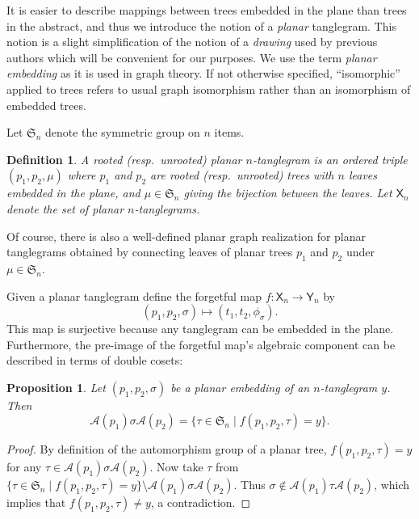 \documentclass{amsart}
\newtheorem{proposition}{Proposition}
\newtheorem{definition}{Definition}
\newcommand{\fS}{\mathfrak S}
\newcommand{\aut}{\mathcal A}
\newcommand{\pairing}{\mu}
\newcommand{\ptangle}{\mathsf{X}}
\newcommand{\tangle}{\mathsf{Y}}
\begin{document}
It is easier to describe mappings between trees embedded in the plane than trees in the abstract, and thus we introduce the notion of a \emph{planar} tanglegram.
This notion is a slight simplification of the notion of a \emph{drawing} used by previous authors \cite{Venkatachalam2010-zh} which will be convenient for our purposes.
We use the term \emph{planar embedding} as it is used in graph theory.
If not otherwise specified, ``isomorphic'' applied to trees refers to usual graph isomorphism rather than an isomorphism of embedded trees.

Let $\fS_n$ denote the symmetric group on $n$ items.
\begin{definition}
\label{def:ptanglegram}
A rooted (resp.\ unrooted) \emph{planar $n$-tanglegram} is an ordered triple $(p_1, p_2, \pairing)$ where $p_1$ and $p_2$ are rooted (resp.\ unrooted) trees with $n$ leaves embedded in the plane, and $\pairing \in \fS_n$ giving the bijection between the leaves.
Let $\ptangle_n$ denote the set of planar $n$-tanglegrams.
\end{definition}

Of course, there is also a well-defined planar graph realization for planar tanglegrams obtained by connecting leaves of planar trees $p_1$ and $p_2$ under $\pairing \in \fS_n$.

Given a planar tanglegram define the forgetful map $f: \ptangle_n \rightarrow \tangle_n$ by
\begin{equation}
\label{eq:forgetful}
(p_1, p_2, \sigma) \mapsto (t_1, t_2, \phi_\sigma).
\end{equation}
This map is surjective because any tanglegram can be embedded in the plane.
Furthermore, the pre-image of the forgetful map's algebraic component can be described in terms of double cosets:
\begin{proposition}
\label{prop:doubleCosets}
Let $(p_1, p_2, \sigma)$ be a planar embedding of an $n$-tanglegram $y$. Then
\[
\aut(p_1) \sigma \aut(p_2) = \{\tau \in \fS_n \mid f(p_1, p_2, \tau) = y\}.
\]
\end{proposition}
\begin{proof}
By definition of the automorphism group of a planar tree, $f(p_1, p_2, \tau) = y$ for any $\tau \in \aut(p_1) \sigma \aut(p_2)$.
Now take $\tau$ from $\{\tau \in \fS_n \mid f(p_1, p_2, \tau) = y\} \setminus \aut(p_1) \sigma \aut(p_2)$.
Thus $\sigma \not \in \aut(p_1) \tau \aut(p_2)$, which implies that $f(p_1, p_2, \tau) \neq y$, a contradiction.
\end{proof}
\end{document}
